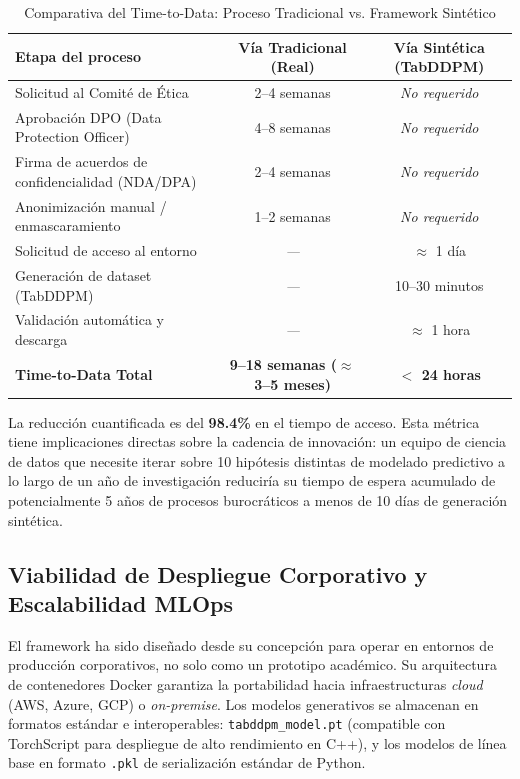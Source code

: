 \begin{table}[htbp]
\centering
\caption{Comparativa del Time-to-Data: Proceso Tradicional vs. Framework Sintético}
\label{tab:ttd_comparativa}
\begin{tabularx}{\textwidth}{>{\raggedright\arraybackslash}X c c}
\toprule
\textbf{Etapa del proceso} & \textbf{Vía Tradicional (Real)} & \textbf{Vía Sintética (TabDDPM)} \\
\midrule
\rowcolor{gray!10} Solicitud al Comité de Ética & 2--4 semanas & \textit{No requerido} \\
Aprobación DPO (Data Protection Officer) & 4--8 semanas & \textit{No requerido} \\
\rowcolor{gray!10} Firma de acuerdos de confidencialidad (NDA/DPA) & 2--4 semanas & \textit{No requerido} \\
Anonimización manual / enmascaramiento & 1--2 semanas & \textit{No requerido} \\
\rowcolor{gray!10} Solicitud de acceso al entorno & \textit{---} & $\approx$ 1 día \\
Generación de dataset (TabDDPM) & \textit{---} & 10--30 minutos \\
\rowcolor{gray!10} Validación automática y descarga & \textit{---} & $\approx$ 1 hora \\
\midrule
\rowcolor{uaxblue!10} \textbf{Time-to-Data Total} & \textbf{9--18 semanas ($\approx$ 3--5 meses)} & \textbf{$<$ 24 horas} \\
\bottomrule
\end{tabularx}
\end{table}

La reducción cuantificada es del \textbf{98.4\%} en el tiempo de acceso. Esta métrica tiene implicaciones directas sobre la cadencia de innovación: un equipo de ciencia de datos que necesite iterar sobre 10 hipótesis distintas de modelado predictivo a lo largo de un año de investigación reduciría su tiempo de espera acumulado de potencialmente 5 años de procesos burocráticos a menos de 10 días de generación sintética.

\subsection{Viabilidad de Despliegue Corporativo y Escalabilidad MLOps}

El framework ha sido diseñado desde su concepción para operar en entornos de producción corporativos, no solo como un prototipo académico. Su arquitectura de contenedores Docker garantiza la portabilidad hacia infraestructuras \textit{cloud} (AWS, Azure, GCP) o \textit{on-premise}. Los modelos generativos se almacenan en formatos estándar e interoperables: \texttt{tabddpm\_model.pt} (compatible con TorchScript para despliegue de alto rendimiento en C++), y los modelos de línea base en formato \texttt{.pkl} de serialización estándar de Python.

